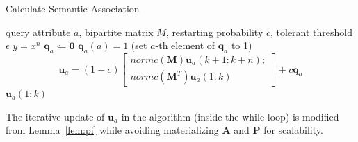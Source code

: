 \renewcommand{\algorithmicrequire}{\textbf{Input:}}
\renewcommand{\algorithmicensure}{\textbf{Output:}}
\begin{algorithm}
\caption{Calculate Semantic Association}
\label{alg1}
\begin{algorithmic}
\REQUIRE query attribute $a$, bipartite matrix $M$, restarting probability $c$, tolerant threshold $\epsilon$
\ENSURE $y = x^n$
\STATE $\mathbf{q}_a \Leftarrow \mathbf{0}$
\STATE $\mathbf{q}_a(a)=1$ (set $a$-th element of $\mathbf{q}_a$ to 1)
\STATE \[
    \mathbf{u}_a = (1-c)  \left[ \begin{array}{c}
        normc(\mathbf{M})\mathbf{u}_a(k+1:k+n);\\
        normc(\mathbf{M}^T)\mathbf{u}_a(1:k)
    \end{array} \right] + c\mathbf{q}_a
\]
\ENDWHILE
\RETURN $\mathbf{u}_a(1:k)$
\end{algorithmic}
\end{algorithm}

The iterative update of $\mathbf{u}_a$ in the algorithm (inside the while loop) is modified from Lemma~\ref{lem:pi} while avoiding materializing $\mathbf{A}$ and $\mathbf{P}$ for scalability. 